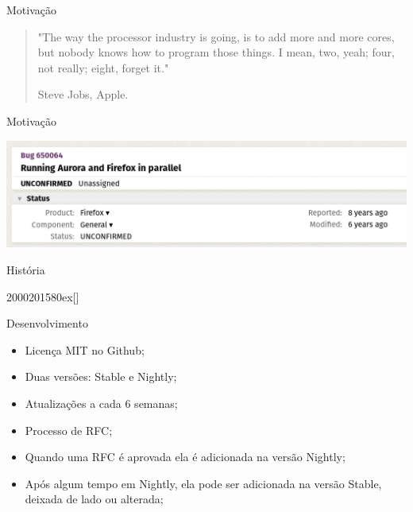 \documentclass[aspectratio=169]{beamer}
\begin{document}
\begin{frame}{Motivação}
	\begin{quote}
		"The way the processor industry is going, is to add more and more cores, but nobody knows how to program those things. I mean, two, yeah; four, not really; eight, forget it."
		
		\hspace{8.2cm}Steve Jobs, Apple.
	\end{quote}
\end{frame}

\begin{frame}{Motivação}
	\begin{center}
		\includegraphics[width=13.5cm]{imgs/bug.png}
	\end{center}
\end{frame}

\begin{frame}{História}
	\begin{chronology}[5]{2000}{2015}{80ex}[\textwidth]
	\end{chronology}
\end{frame}

\begin{frame}{Desenvolvimento}
	\begin{itemize}
		\item Licença MIT no Github;
		\item Duas versões: Stable e Nightly;
		\item Atualizações a cada 6 semanas;
		\item Processo de RFC;
		\item Quando uma RFC é aprovada ela é adicionada na versão Nightly;
		\item Após algum tempo em Nightly, ela pode ser adicionada na versão Stable, deixada de lado ou alterada;	
	\end{itemize}
\end{frame}
\end{document}
